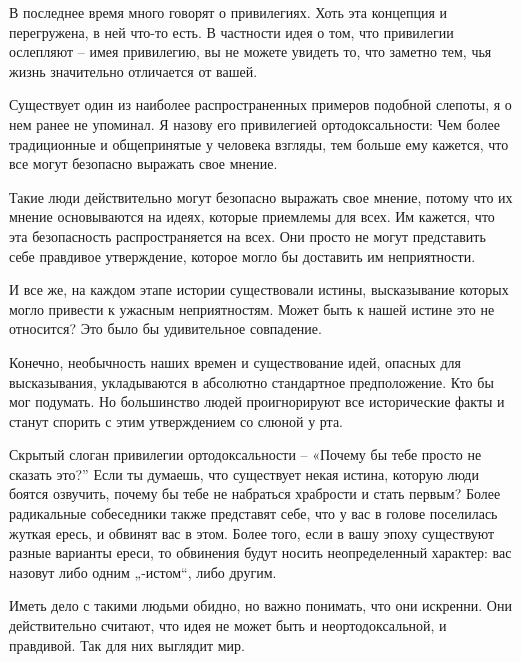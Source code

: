 \documentclass[ebook,12pt,oneside,openany]{memoir}
\date{}
\begin{document}
\maketitle

В последнее время много говорят о привилегиях. Хоть эта концепция и
перегружена, в ней что-то есть. В частности идея о том, что привилегии
ослепляют – имея привилегию, вы не можете увидеть то, что заметно тем,
чья жизнь значительно отличается от вашей. \newline

Существует один из наиболее распространенных примеров подобной
слепоты, я о нем ранее не упоминал. Я назову его привилегией
ортодоксальности: Чем более традиционные и общепринятые у человека
взгляды, тем больше ему кажется, что все могут безопасно выражать свое
мнение. \newline

Такие люди действительно могут безопасно выражать свое мнение, потому
что их мнение основываются на идеях, которые приемлемы для всех. Им
кажется, что эта безопасность распространяется на всех. Они просто не
могут представить себе правдивое утверждение, которое могло бы
доставить им неприятности. \newline

И все же, на каждом этапе истории существовали истины, высказывание
которых могло привести к ужасным неприятностям. Может быть к нашей
истине это не относится? Это было бы удивительное совпадение. \newline

Конечно, необычность наших времен и существование идей, опасных для
высказывания, укладываются в абсолютно стандартное предположение. Кто
бы мог подумать. Но большинство людей проигнорируют все исторические
факты и станут спорить с этим утверждением со слюной у рта. \newline

Скрытый слоган привилегии ортодоксальности – «Почему бы тебе просто не
сказать это?” Если ты думаешь, что существует некая истина, которую
люди боятся озвучить, почему бы тебе не набраться храбрости и стать
первым? Более радикальные собеседники также представят себе, что у вас
в голове поселилась жуткая ересь, и обвинят вас в этом. Более того,
если в вашу эпоху существуют разные варианты ереси, то обвинения будут
носить неопределенный характер: вас назовут либо одним „-истом“, либо
другим. \newline

Иметь дело с такими людьми обидно, но важно понимать, что они
искренни. Они действительно считают, что идея не может быть и
неортодоксальной, и правдивой. Так для них выглядит мир. \newline
\end{document}
